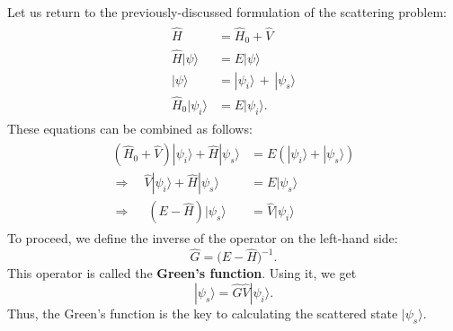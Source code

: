 \documentclass[pra,12pt]{revtex4}
\begin{document}
Let us return to the previously-discussed formulation of the
scattering problem:
\begin{align}
  \begin{aligned} \hat{H} &= \hat{H}_0+\hat{V} \\ \hat{H} |\psi\rangle &= E |\psi\rangle \\ |\psi\rangle &= |\psi_i\rangle \,+\, |\psi_s\rangle \\ \hat{H}_0 |\psi_i\rangle &= E |\psi_i\rangle.\end{aligned}
\end{align}
These equations can be combined as follows:
\begin{align}
  \begin{aligned} \left(\hat{H}_0 + \hat{V}\right) |\psi_i\rangle + \hat{H} |\psi_s\rangle &= E \left( |\psi_i\rangle + |\psi_s\rangle \right) \\ \Rightarrow \quad \hat{V} |\psi_i\rangle + \hat{H} |\psi_s\rangle &= E |\psi_s\rangle  \\ \Rightarrow \quad\; \left(E - \hat{H}\right) |\psi_s\rangle & = \hat{V} |\psi_i\rangle
  \end{aligned}
\end{align}
To proceed, we define the inverse of the operator on the left-hand
side:
\begin{equation}
  \hat{G} = \big(E-\hat{H}\big)^{-1}.
  \label{Gdef}
\end{equation}
This operator is called the \textbf{Green's function}.  Using it, we
get
\begin{equation}
  |\psi_s\rangle = \hat{G} \hat{V} |\psi_i\rangle.
  \label{scatterform}
\end{equation}
Thus, the Green's function is the key to calculating the scattered
state $|\psi_s\rangle$.
\end{document}
